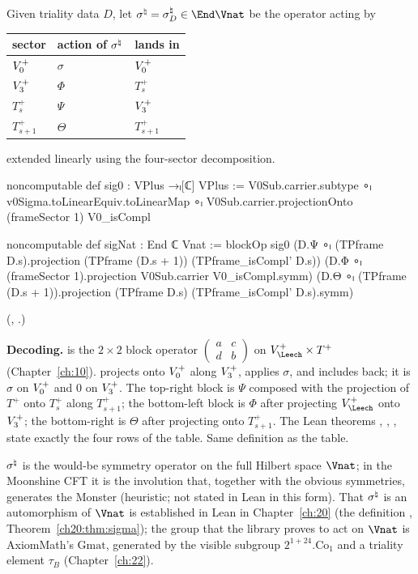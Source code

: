 \begin{definition}\label{ch14:def:signat}
Given triality data $D$, let $\chXIVsig=\chXIVsig_D\in\End\Vnat$ be the operator acting by
\begin{center}
\begin{tabular}{lll}
\toprule
sector & action of $\sigma^{\natural}$ & lands in \\ \midrule
$V_0^{+}$ & $\sigma$ & $V_0^{+}$\\
$V_3^{+}$ & $\Phi$ & $T_s^+$\\
$T_s^+$ & $\Psi$ & $V_3^{+}$\\
$T_{s+1}^+$ & $\Theta$ & $T_{s+1}^+$\\ \bottomrule
\end{tabular}
\end{center}
extended linearly using the four-sector decomposition.
\end{definition}
\begin{leancode}
noncomputable def sig0 : VPlus →ₗ[ℂ] VPlus :=
  V0Sub.carrier.subtype ∘ₗ v0Sigma.toLinearEquiv.toLinearMap ∘ₗ
    V0Sub.carrier.projectionOnto (frameSector 1) V0_isCompl

noncomputable def sigNat : End ℂ Vnat :=
  blockOp sig0
    (D.Ψ ∘ₗ (TPframe D.s).projection (TPframe (D.s + 1)) (TPframe_isCompl' D.s))
    (D.Φ ∘ₗ (frameSector 1).projection V0Sub.carrier V0_isCompl.symm)
    (D.Θ ∘ₗ (TPframe (D.s + 1)).projection (TPframe D.s) (TPframe_isCompl' D.s).symm)
\end{leancode}
(, .)

\begin{dictionary}
\textbf{Decoding.}   is the $2\times2$ block operator
$\begin{pmatrix}a&c\\d&b\end{pmatrix}$ on $V_\Leech^+\times T^+$ (Chapter~\ref{ch:10}).
 projects onto $V_0^{+}$ along $V_3^{+}$, applies $\sigma$, and includes back; it is $\sigma$ on
$V_0^{+}$ and $0$ on $V_3^{+}$.  The top-right block is $\Psi$ composed with the projection of $T^+$ onto
$T_s^+$ along $T_{s+1}^+$; the bottom-left block is $\Phi$ after projecting $V_\Leech^+$ onto $V_3^{+}$;
the bottom-right is $\Theta$ after projecting onto $T_{s+1}^+$.  The Lean theorems
, , ,  state exactly the four rows of the
table.  Same definition as the table.
\end{dictionary}
\begin{physics}
$\sigma^{\natural}$ is the would-be symmetry operator on the full Hilbert space $\Vnat$; in the Moonshine CFT it is the involution that, together with the obvious symmetries, generates the Monster (heuristic; not stated in Lean in this form).  That $\sigma^{\natural}$ is an automorphism of $\Vnat$ is established in Lean in Chapter~\ref{ch:20} (the definition , Theorem~\ref{ch20:thm:sigma}); the group that the library proves to act on $\Vnat$ is AxiomMath's $\mathrm{Gmat}$, generated by the visible subgroup $2^{1+24}.\mathrm{Co}_1$ and a triality element $\tau_B$ (Chapter~\ref{ch:22}).
\end{physics}


